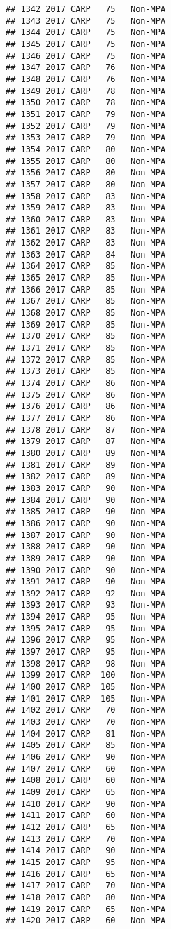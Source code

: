 \documentclass[]{article}
\begin{document}
\begin{verbatim}
## 1342 2017 CARP   75   Non-MPA
## 1343 2017 CARP   75   Non-MPA
## 1344 2017 CARP   75   Non-MPA
## 1345 2017 CARP   75   Non-MPA
## 1346 2017 CARP   75   Non-MPA
## 1347 2017 CARP   76   Non-MPA
## 1348 2017 CARP   76   Non-MPA
## 1349 2017 CARP   78   Non-MPA
## 1350 2017 CARP   78   Non-MPA
## 1351 2017 CARP   79   Non-MPA
## 1352 2017 CARP   79   Non-MPA
## 1353 2017 CARP   79   Non-MPA
## 1354 2017 CARP   80   Non-MPA
## 1355 2017 CARP   80   Non-MPA
## 1356 2017 CARP   80   Non-MPA
## 1357 2017 CARP   80   Non-MPA
## 1358 2017 CARP   83   Non-MPA
## 1359 2017 CARP   83   Non-MPA
## 1360 2017 CARP   83   Non-MPA
## 1361 2017 CARP   83   Non-MPA
## 1362 2017 CARP   83   Non-MPA
## 1363 2017 CARP   84   Non-MPA
## 1364 2017 CARP   85   Non-MPA
## 1365 2017 CARP   85   Non-MPA
## 1366 2017 CARP   85   Non-MPA
## 1367 2017 CARP   85   Non-MPA
## 1368 2017 CARP   85   Non-MPA
## 1369 2017 CARP   85   Non-MPA
## 1370 2017 CARP   85   Non-MPA
## 1371 2017 CARP   85   Non-MPA
## 1372 2017 CARP   85   Non-MPA
## 1373 2017 CARP   85   Non-MPA
## 1374 2017 CARP   86   Non-MPA
## 1375 2017 CARP   86   Non-MPA
## 1376 2017 CARP   86   Non-MPA
## 1377 2017 CARP   86   Non-MPA
## 1378 2017 CARP   87   Non-MPA
## 1379 2017 CARP   87   Non-MPA
## 1380 2017 CARP   89   Non-MPA
## 1381 2017 CARP   89   Non-MPA
## 1382 2017 CARP   89   Non-MPA
## 1383 2017 CARP   90   Non-MPA
## 1384 2017 CARP   90   Non-MPA
## 1385 2017 CARP   90   Non-MPA
## 1386 2017 CARP   90   Non-MPA
## 1387 2017 CARP   90   Non-MPA
## 1388 2017 CARP   90   Non-MPA
## 1389 2017 CARP   90   Non-MPA
## 1390 2017 CARP   90   Non-MPA
## 1391 2017 CARP   90   Non-MPA
## 1392 2017 CARP   92   Non-MPA
## 1393 2017 CARP   93   Non-MPA
## 1394 2017 CARP   95   Non-MPA
## 1395 2017 CARP   95   Non-MPA
## 1396 2017 CARP   95   Non-MPA
## 1397 2017 CARP   95   Non-MPA
## 1398 2017 CARP   98   Non-MPA
## 1399 2017 CARP  100   Non-MPA
## 1400 2017 CARP  105   Non-MPA
## 1401 2017 CARP  105   Non-MPA
## 1402 2017 CARP   70   Non-MPA
## 1403 2017 CARP   70   Non-MPA
## 1404 2017 CARP   81   Non-MPA
## 1405 2017 CARP   85   Non-MPA
## 1406 2017 CARP   90   Non-MPA
## 1407 2017 CARP   60   Non-MPA
## 1408 2017 CARP   60   Non-MPA
## 1409 2017 CARP   65   Non-MPA
## 1410 2017 CARP   90   Non-MPA
## 1411 2017 CARP   60   Non-MPA
## 1412 2017 CARP   65   Non-MPA
## 1413 2017 CARP   70   Non-MPA
## 1414 2017 CARP   90   Non-MPA
## 1415 2017 CARP   95   Non-MPA
## 1416 2017 CARP   65   Non-MPA
## 1417 2017 CARP   70   Non-MPA
## 1418 2017 CARP   80   Non-MPA
## 1419 2017 CARP   65   Non-MPA
## 1420 2017 CARP   60   Non-MPA

\end{verbatim}
\end{document}
